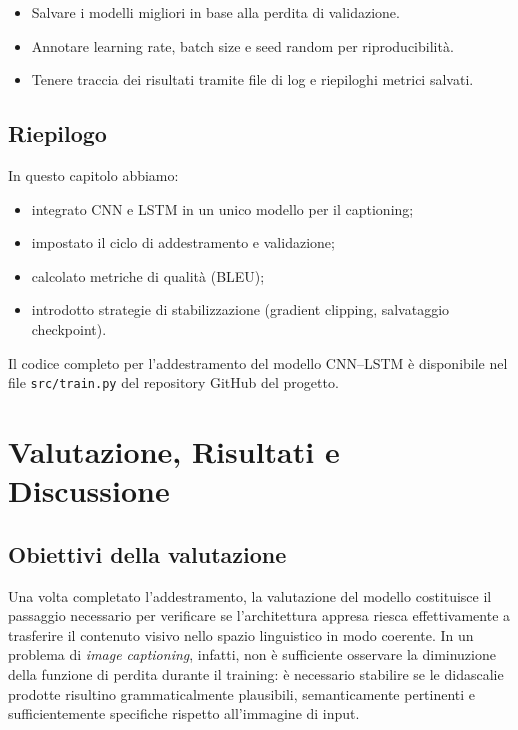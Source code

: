 \documentclass[11pt,a4paper]{report}
\begin{document}
\begin{tcolorbox}[title=Buone pratiche]
\begin{itemize}
  \item Salvare i modelli migliori in base alla perdita di validazione.
  \item Annotare learning rate, batch size e seed random per riproducibilità.
  \item Tenere traccia dei risultati tramite file di log e riepiloghi metrici salvati.
\end{itemize}
\end{tcolorbox}

\section{Riepilogo}

In questo capitolo abbiamo:
\begin{itemize}
  \item integrato CNN e LSTM in un unico modello per il captioning;
  \item impostato il ciclo di addestramento e validazione;
  \item calcolato metriche di qualità (BLEU);
  \item introdotto strategie di stabilizzazione (gradient clipping, salvataggio checkpoint).
\end{itemize}

\begin{tcolorbox}[title=Riferimento al codice]
Il codice completo per l’addestramento del modello CNN–LSTM è disponibile nel file \texttt{src/train.py} del repository GitHub del progetto.
\end{tcolorbox}

\chapter{Valutazione, Risultati e Discussione}

\section{Obiettivi della valutazione}

Una volta completato l’addestramento, la valutazione del modello costituisce il passaggio necessario per verificare se l’architettura appresa riesca effettivamente a trasferire il contenuto visivo nello spazio linguistico in modo coerente. In un problema di \emph{image captioning}, infatti, non è sufficiente osservare la diminuzione della funzione di perdita durante il training: è necessario stabilire se le didascalie prodotte risultino grammaticalmente plausibili, semanticamente pertinenti e sufficientemente specifiche rispetto all’immagine di input.
\end{document}

